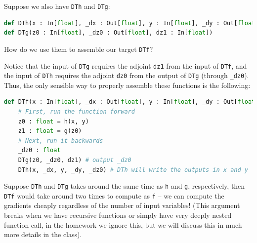 Suppose we also have \lstinline{DTh} and \lstinline{DTg}:
\begin{lstlisting}[language=Python]
def DTh(x : In[float], _dx : Out[float], y : In[float], _dy : Out[float], dz0 : In[float])
def DTg(z0 : In[float], _dz0 : Out[float], dz1 : In[float])
\end{lstlisting}
How do we use them to assemble our target \lstinline{DTf}?

Notice that the input of \lstinline{DTg} requires the adjoint \lstinline{dz1} from the input of \lstinline{DTf}, and the input of \lstinline{DTh} requires the adjoint \lstinline{dz0} from the output of \lstinline{DTg} (through \lstinline{_dz0}). Thus, the only sensible way to properly assemble these functions is the following:
\begin{lstlisting}[language=Python]
def DTf(x : In[float], _dx : Out[float], y : In[float], _dy : Out[float], dz1 : In[float]):
	# First, run the function forward
	z0 : float = h(x, y)
	z1 : float = g(z0)
	# Next, run it backwards
	_dz0 : float
	DTg(z0, _dz0, dz1) # output _dz0
	DTh(x, _dx, y, _dy, _dz0) # DTh will write the outputs in x and y 
\end{lstlisting}
Suppose \lstinline{DTh} and \lstinline{DTg} takes around the same time as \lstinline{h} and \lstinline{g}, respectively, then \lstinline{DTf} would take around two times to compute as \lstinline{f} -- we can compute the gradients cheaply regardless of the number of input variables! (This argument breaks when we have recursive functions or simply have very deeply nested function call, in the homework we ignore this, but we will discuss this in much more details in the class).

